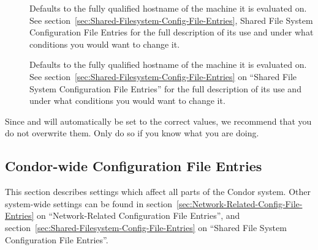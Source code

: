 \begin{description}
\item[]
  \label{param:FilesystemDomain}
  Defaults to the fully
  qualified hostname of the machine it is evaluated on.  See
  section~\ref{sec:Shared-Filesystem-Config-File-Entries}, Shared
  File System Configuration File Entries for the full description of
  its use and under what conditions you would want to change it.

\item[]
  \label{param:UIDDomain}
  Defaults to the fully
  qualified hostname of the machine it is evaluated on.  See
  section~\ref{sec:Shared-Filesystem-Config-File-Entries} on ``Shared
  File System Configuration File Entries'' for the full description of
  its use and under what conditions you would want to change it.

\end{description}

Since  and  will automatically be set to the
correct values, we recommend that you do not overwrite them.
Only do so if you know what you are doing.


\subsection{\label{sec:Condor-wide-Config-File-Entries}Condor-wide Configuration File Entries} 


This section describes settings which affect all parts of the Condor
system. 
Other system-wide settings can be found in
section~\ref{sec:Network-Related-Config-File-Entries} on
``Network-Related Configuration File Entries'', and
section~\ref{sec:Shared-Filesystem-Config-File-Entries} on ``Shared
File System Configuration File Entries''. 

